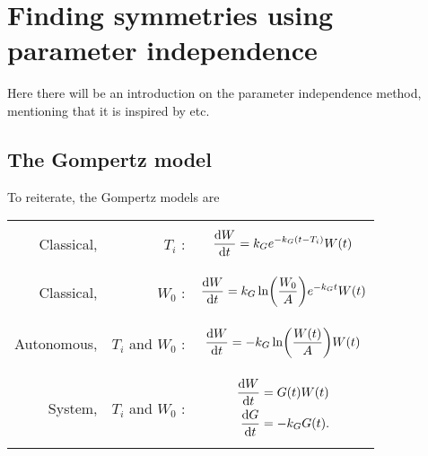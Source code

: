 \chapter{Finding symmetries using parameter independence}

Here there will be an introduction on the parameter independence method, mentioning that it is inspired by \cite{ovsiannikov1982group} etc.

\section{The Gompertz model}
To reiterate, the Gompertz models are\par\noindent
\begin{tabularx}{\linewidth}{rrM}
  Classical, & \(T_i\) :&
  \begin{minipage}{\linewidth}
    \begin{equation}
      \dv{W}{t} = k_G e^{-k_G (t - T_i)} W(t) \label{eq:gompertz-classical-ti^param}
    \end{equation}
  \end{minipage}\tabularnewline
  Classical, & \(W_0\) :&
  \begin{minipage}{\linewidth}
    \begin{equation}
      \dv{W}{t} = k_G \ln(\frac{W_0}{A})e^{-k_G t} W(t) \label{eq:gompertz-classical-w0^param}
    \end{equation}
  \end{minipage}\tabularnewline
  Autonomous, & \(T_i\) and \(W_0\) :&
  \begin{minipage}{\linewidth}
    \begin{equation}
      \dv{W}{t} = -k_G \ln(\frac{W(t)}{A}) W(t) \label{eq:gompertz-autonomous^param}
    \end{equation}
  \end{minipage}\tabularnewline
  System, & \(T_i\) and \(W_0\) :&
  \begin{minipage}{\linewidth}%
    {\begin{subequations}\label{eq:gompertz-system^param}
      \begin{align}
        \dv{W}{t} &= G(t) W(t) \label{eq:gompertz-system-a^param}\\
        \dv{G}{t} &= -k_G G(t). \label{eq:gompertz-system-b^param}
      \end{align}
    \end{subequations}}%
  \end{minipage}
\end{tabularx}

